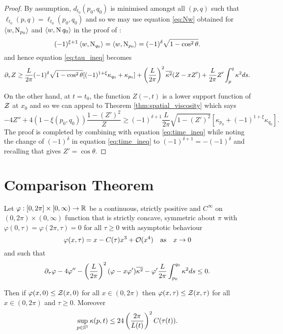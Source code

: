 \documentclass[a4paper, 12pt]{amsart}
\begin{document}
\begin{proof}
By assumption, \(d_{t_0} (p_0, q_0)\) is minimised amongst all \((p, q)\) such that \(\ell_{t_0}(p, q) = \ell_{t_0}(p_0, q_0)\) and so we may use equation \eqref{eq:Nw} obtained for $\inpr{w}{\nor_{p_0}}$ and $\inpr{w}{\nor{q_0}}$ in the proof of :
\[
(-1)^{\xi+1} \inpr{w}{\nor_{q_0}} = \inpr{w}{\nor_{p_0}} =  (-1)^\delta \sqrt{1-\cos^2\theta}.
\]
and hence equation \eqref{eq:tau_ineq} becomes
\begin{equation}
\label{eq:time_ineq}
\partial_{\tau} Z \geq \frac{L}{2\pi} (-1)^\delta \sqrt{1-\cos^2\theta} [(-1)^{1+\xi}\kappa_{q_0} + \kappa_{p_0}] + \left(\frac{L}{2\pi}\right)^2 \avg{\kappa^2} (Z - x Z') + \frac{L}{2\pi} Z' \int_p^q \kappa^2 ds.
\end{equation}

On the other hand, at $t=t_0$, the function $Z(-, t)$ is a lower support function of $\chordarcprofile$ at $x_0$ and so we can appeal to Theorem \ref{thm:spatial_viscosity} which says
\[
-4Z'' + 4(1-\xi(p_0,q_0)) \frac{1 - (Z')^2}{Z} \geq (-1)^{\delta+1} \frac{L}{2\pi} \sqrt{1 - (Z')^2} \left[\kappa_{p_0} + (-1)^{1+\xi} \kappa_{q_0}\right].
\]
The proof is completed by combining with equation \eqref{eq:time_ineq} while noting the change of \((-1)^{\delta}\) in equation \eqref{eq:time_ineq} to \((-1)^{\delta + 1} = -(-1)^{\delta}\) and recalling that  gives \(Z' = \cos\theta\).
\end{proof}

\section{Comparison Theorem}
\label{sec:comparison}

\begin{thm}
\label{thm:comparison}
Let \(\varphi : [0, 2\pi] \times [0, \infty) \to \R\) be a continuous, strictly positive and \(C^{\infty}\) on \((0, 2\pi) \times (0, \infty)\) function that is strictly concave, symmetric about \(\pi\) with \(\varphi(0, \tau) = \varphi(2\pi, \tau) = 0\) for all \(\tau \geq 0\) with asymptotic behaviour
\[
\varphi(x, \tau) = x - C(\tau) x^3 + \bigo(x^4)  \quad \text{as} \quad x \to 0
\]
and such that
\[
\partial_{\tau} \varphi - 4 \varphi'' - \left(\frac{L}{2\pi}\right)^2 (\varphi - x \varphi') \avg{\kappa^2} - \varphi' \frac{L}{2\pi} \int_{p_0}^{q_0} \kappa^2 ds \leq 0.
\]

Then if \(\varphi (x, 0) \leq \chordarcprofile(x, 0)\) for all \(x \in (0, 2\pi)\) then \(\varphi (x, \tau) \leq \chordarcprofile(x, \tau)\) for all \(x \in (0, 2\pi)\) and \(\tau \geq 0\). Moreover
\[
\sup_{p \in \S^1} \kappa(p, t) \leq 24\left(\frac{2\pi}{L(t)}\right)^2 C(\tau(t)).
\]
\end{thm}
\end{document}
